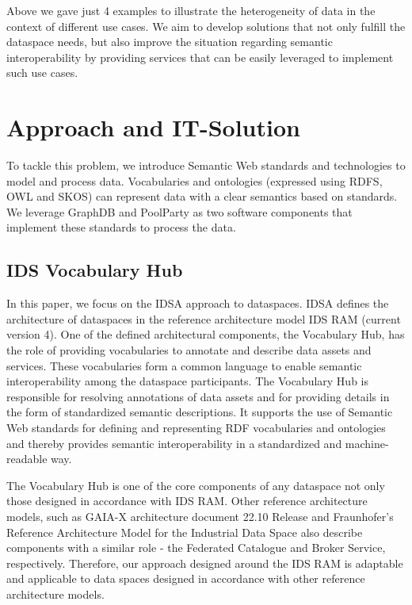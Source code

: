 \documentclass[
  super,
  preprint,
  3p]{elsarticle}
\begin{document}
Above we gave just 4 examples to illustrate the heterogeneity of data in
the context of different use cases. We aim to develop solutions that not
only fulfill the dataspace needs, but also improve the situation
regarding semantic interoperability by providing services that can be
easily leveraged to implement such use cases.

\section{Approach and IT-Solution}\label{approach-and-it-solution}

To tackle this problem, we introduce Semantic Web standards and
technologies to model and process data. Vocabularies and ontologies
(expressed using RDFS, OWL and SKOS) can represent data with a clear
semantics based on standards. We leverage GraphDB and PoolParty as two
software components that implement these standards to process the data.

\subsection{IDS Vocabulary Hub}\label{ids-vocabulary-hub}

In this paper, we focus on the IDSA approach to dataspaces. IDSA defines
the architecture of dataspaces in the reference architecture model IDS
RAM (current version 4). One of the defined architectural components,
the Vocabulary Hub, has the role of providing vocabularies to annotate
and describe data assets and services. These vocabularies form a common
language to enable semantic interoperability among the dataspace
participants. The Vocabulary Hub is responsible for resolving
annotations of data assets and for providing details in the form of
standardized semantic descriptions. It supports the use of Semantic Web
standards for defining and representing RDF vocabularies and ontologies
and thereby provides semantic interoperability in a standardized and
machine-readable way.

The Vocabulary Hub is one of the core components of any dataspace not
only those designed in accordance with IDS RAM. Other reference
architecture models, such as GAIA-X architecture document 22.10 Release
\citep{GaiaXArchitectureDocument2022} and Fraunhofer's Reference
Architecture Model for the Industrial Data Space
\citep{ReferenceArhictectureModel2017} also describe components with a
similar role - the Federated Catalogue and Broker Service, respectively.
Therefore, our approach designed around the IDS RAM is adaptable and
applicable to data spaces designed in accordance with other reference
architecture models.
\end{document}
